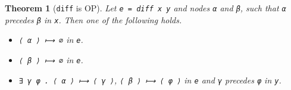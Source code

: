 \documentclass{sigplanconf}
\theoremstyle{plain}
\newtheorem{thm}{Theorem}
\begin{document}
%
\begin{thm}[\texttt{diff} is OP]
Let \texttt{e = diff x y} and nodes \texttt{α} and \texttt{β},
such that \texttt{α} precedes \texttt{β} in \texttt{x}.
Then one of the following holds.
\begin{itemize}
\item \texttt{⟨ α ⟩ ⟼ ∅} in \texttt{e}. %
\item \texttt{⟨ β ⟩ ⟼ ∅} in \texttt{e}. %
\item \texttt{∃ γ φ . ⟨ α ⟩ ⟼ ⟨ γ ⟩}, \texttt{⟨ β ⟩ ⟼ ⟨ φ ⟩} in
  \texttt{e} and \texttt{γ} precedes \texttt{φ} in \texttt{y}.
\end{itemize}
\end{thm}

\end{document}
